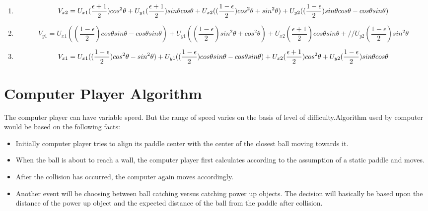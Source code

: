 \documentclass{article}
\begin{document}
\begin{itemize}
\begin{enumerate}
				\item \[V_{x2} = U_{x1}(\frac{\epsilon + 1}{2})cos^2\theta + U_{y1}(\frac{\epsilon + 1}{2})sin\theta cos\theta + U_{x2}((\frac{1 - \epsilon}{2})cos^2\theta + sin^2\theta) + \\ U_{y2}((\frac{1 - \epsilon}{2})sin\theta cos\theta - cos\theta sin\theta) \]

				\item \[ V_{y1} = U_{x1}((\frac{1 - \epsilon}{2})cos\theta sin\theta - cos\theta sin\theta) + U_{y1}((\frac{1 - \epsilon}{2})sin^2\theta + cos^2\theta) + U_{x2}(\frac{\epsilon + 1}{2})cos\theta sin\theta + // U_{y2}(\frac{1 - \epsilon}{2})sin^2\theta \]
				
				\item \[ V_{x1} = U_{x1}((\frac{1 - \epsilon}{2})cos^2\theta - sin^2\theta) + U_{y1}((\frac{1 - \epsilon}{2})cos\theta sin\theta - cos\theta sin\theta) + U_{x2}(\frac{\epsilon + 1}{2})cos^2\theta + \\ U_{y2}(\frac{1 - \epsilon}{2})sin\theta cos\theta \]

				\end{enumerate}

			\end{itemize}
			

			\section{Computer Player Algorithm}
			\par\noindent The computer player can have variable speed. But the range of speed varies on the basis of level of difficulty.Algorithm used by computer would be based on the following facts:

			\begin{itemize}
			\item Initially computer player tries to align its paddle center with the center of the closest ball moving towards it.
			\item When the ball is about to reach a wall, the computer player first calculates according to the assumption of a static paddle and moves.
			\item After the collision has occurred, the computer again moves accordingly.
			\item Another event will be choosing between ball catching versus catching power up objects. The decision will basically be based upon the distance of the power up object and the expected distance of the ball from the paddle after collision.
			\end{itemize}
\end{document}
